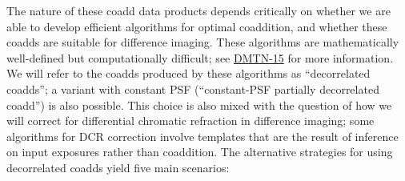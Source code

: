 The nature of these coadd data products depends critically on whether we are able to develop efficient algorithms for optimal coaddition, and whether these coadds are suitable for difference imaging.  These algorithms are mathematically well-defined but computationally difficult; see \href{http://dmtn-015.lsst.io/en/latest/}{DMTN-15} for more information.  We will refer to the coadds produced by these algorithms as ``decorrelated coadds''; a variant with constant PSF (``constant-PSF partially decorrelated coadd'') is also possible.  This choice is also mixed with the question of how we will correct for differential chromatic refraction in difference imaging; some algorithms for DCR correction involve templates that are the result of inference on input exposures rather than coaddition.  The alternative strategies for using decorrelated coadds yield five main scenarios:

